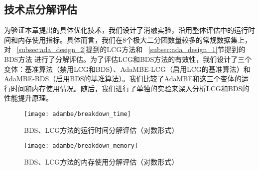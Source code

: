 \subsection{技术点分解评估}
\label{subsec:ada_breakdown}

为验证本章提出的具体优化技术，我们设计了消融实验，沿用整体评估中的运行时间和内存使用指标。具体而言，我们在8个极大二分团数量较多的常规数据集上，对
~\ref{subsec:ada_design_2}提到的LCG方法和
~\ref{subsec:ada_design_1}节提到的BDS方法
进行了分解评估。为了评估LCG和BDS方法的有效性，我们设计了三个变体：基准算法（禁用LCG和BDS）、AdaMBE-LCG（启用LCG的基准算法）和AdaMBE-BDS（启用BDS的基准算法）。我们比较了AdaMBE和这三个变体的运行时间和内存使用情况。随后，我们进行了单独的实验来深入分析LCG和BDS的性能提升原理。





\begin{figure} [H]
	\centering
	\texttt{[image: adambe/breakdown\_time]}
	\caption{BDS、LCG方法的运行时间分解评估（对数形式）}

	\label{fig:ada_breakdown_time}
\end{figure}

\begin{figure} [H]
	\centering
	\texttt{[image: adambe/breakdown\_memory]}
	\caption{BDS、LCG方法的内存使用分解评估（对数形式）}

	\label{fig:ada_breakdown_memory}
\end{figure}


